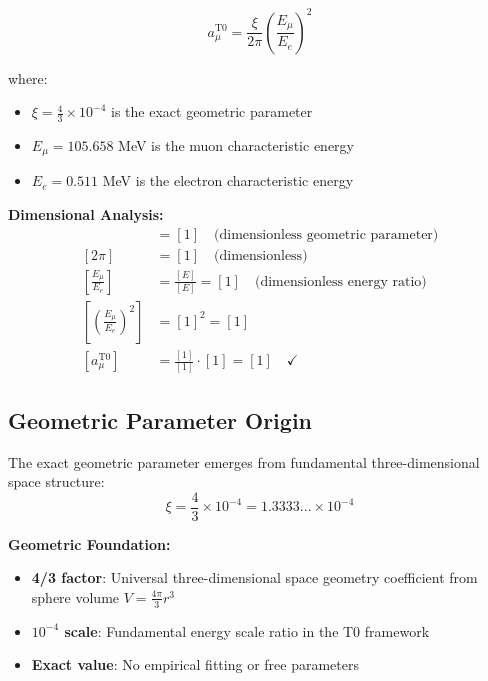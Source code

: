 \documentclass[12pt,a4paper]{report}
\begin{document}
	\begin{equation}
		\boxed{a_\mu^{\text{T0}} = \frac{\xi}{2\pi} \left(\frac{E_\mu}{E_e}\right)^2}
		\label{eq:t0_muon_formula}
	\end{equation}
	
	where:
	\begin{itemize}
		\item $\xi = \frac{4}{3} \times 10^{-4}$ is the exact geometric parameter
		\item $E_\mu = 105.658$ MeV is the muon characteristic energy
		\item $E_e = 0.511$ MeV is the electron characteristic energy
	\end{itemize}
	
	\textbf{Dimensional Analysis:}
	\begin{align}
		[\xi] &= [1] \quad \text{(dimensionless geometric parameter)} \\
		[2\pi] &= [1] \quad \text{(dimensionless)} \\
		\left[\frac{E_\mu}{E_e}\right] &= \frac{[E]}{[E]} = [1] \quad \text{(dimensionless energy ratio)} \\
		\left[\left(\frac{E_\mu}{E_e}\right)^2\right] &= [1]^2 = [1] \\
		[a_\mu^{\text{T0}}] &= \frac{[1]}{[1]} \cdot [1] = [1] \quad \checkmark
	\end{align}
	
	\subsection{Geometric Parameter Origin}
	\label{subsec:geometric_parameter_origin}
	
	The exact geometric parameter emerges from fundamental three-dimensional space structure:
	\begin{equation}
		\xi = \frac{4}{3} \times 10^{-4} = 1.3333... \times 10^{-4}
	\end{equation}
	
	\textbf{Geometric Foundation:}
	\begin{itemize}
		\item \textbf{4/3 factor}: Universal three-dimensional space geometry coefficient from sphere volume $V = \frac{4\pi}{3}r^3$
		\item \textbf{$10^{-4}$ scale}: Fundamental energy scale ratio in the T0 framework
		\item \textbf{Exact value}: No empirical fitting or free parameters
	\end{itemize}
	
\end{document}
